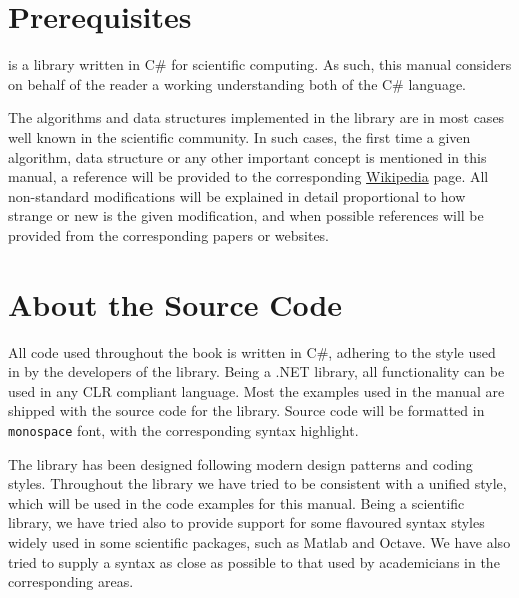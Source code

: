 \section*{Prerequisites}

\sct is a library written in C\# for scientific computing. As
such, this manual considers on behalf of the reader a working
understanding both of the C\# language.

The algorithms and data structures implemented in the library
are in most cases well known in the scientific community.
In such cases, the first time a given algorithm, data structure
or any other important concept is mentioned in this manual, a
reference will be provided to the corresponding 
\href{http://en.wikipedia.org}{Wikipedia} page. All non-standard
modifications will be explained in detail proportional to
how strange or new is the given modification, and when possible
references will be provided from the corresponding papers or
websites.

\section*{About the Source Code}

All code used throughout the book is written in C\#, adhering
to the style used in by the developers of the library. Being a 
.NET library, all functionality can be used in any CLR compliant
language. Most the examples used in the manual are shipped
with the source code for the library. 
Source code will be formatted in \verb|monospace| font, with
the corresponding syntax highlight.

The \sct library has been designed following modern
design patterns and coding styles. Throughout the library we have
tried to be consistent with a unified style, which will be used in
the code examples for this manual. Being a scientific library, we
have tried also to provide support for some flavoured syntax styles
widely used in some scientific packages, such as Matlab and Octave.
We have also tried to supply a syntax as close as possible to that
used by academicians in the corresponding areas.

